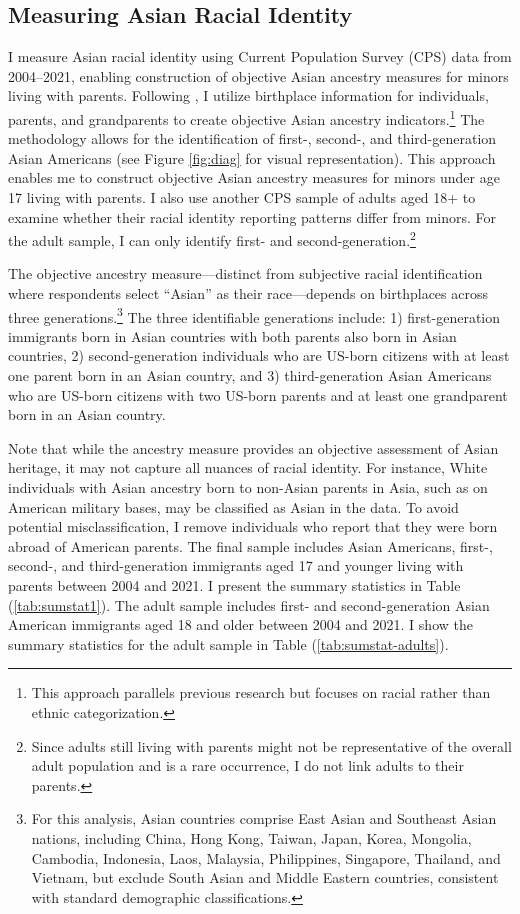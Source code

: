 \subsection{Measuring Asian Racial Identity}\label{subsec:cps}

I measure Asian racial identity using Current Population Survey (CPS) data from 2004--2021, enabling construction of objective Asian ancestry measures for minors living with parents. Following \textcite{antmanEthnicAttritionObserved2016,antmanEthnicAttritionAssimilation2020}, I utilize birthplace information for individuals, parents, and grandparents to create objective Asian ancestry indicators.\footnote{This approach parallels previous research but focuses on racial rather than ethnic categorization.} The methodology allows for the identification of first-, second-, and third-generation Asian Americans (see Figure \ref{fig:diag} for visual representation). This approach enables me to construct objective Asian ancestry measures for minors under age 17 living with parents. I also use another CPS sample of adults aged 18+ to examine whether their racial identity reporting patterns differ from minors. For the adult sample, I can only identify first- and second-generation.\footnote{Since adults still living with parents might not be representative of the overall adult population and is a rare occurrence, I do not link adults to their parents.}

The objective ancestry measure---distinct from subjective racial identification where respondents select ``Asian'' as their race---depends on birthplaces across three generations.\footnote{For this analysis, Asian countries comprise East Asian and Southeast Asian nations, including China, Hong Kong, Taiwan, Japan, Korea, Mongolia, Cambodia, Indonesia, Laos, Malaysia, Philippines, Singapore, Thailand, and Vietnam, but exclude South Asian and Middle Eastern countries, consistent with standard demographic classifications.} The three identifiable generations include: 1) first-generation immigrants born in Asian countries with both parents also born in Asian countries, 2) second-generation individuals who are US-born citizens with at least one parent born in an Asian country, and 3) third-generation Asian Americans who are US-born citizens with two US-born parents and at least one grandparent born in an Asian country. 

Note that while the ancestry measure provides an objective assessment of Asian heritage, it may not capture all nuances of racial identity. For instance, White individuals with Asian ancestry born to non-Asian parents in Asia, such as on American military bases, may be classified as Asian in the data. To avoid potential misclassification, I remove individuals who report that they were born abroad of American parents. The final sample includes Asian Americans, first-, second-, and third-generation immigrants aged 17 and younger living with parents between 2004 and 2021. I present the summary statistics in Table (\ref{tab:sumstat1}). The adult sample includes first- and second-generation Asian American immigrants aged 18 and older between 2004 and 2021. I show the summary statistics for the adult sample in Table (\ref{tab:sumstat-adults}).

